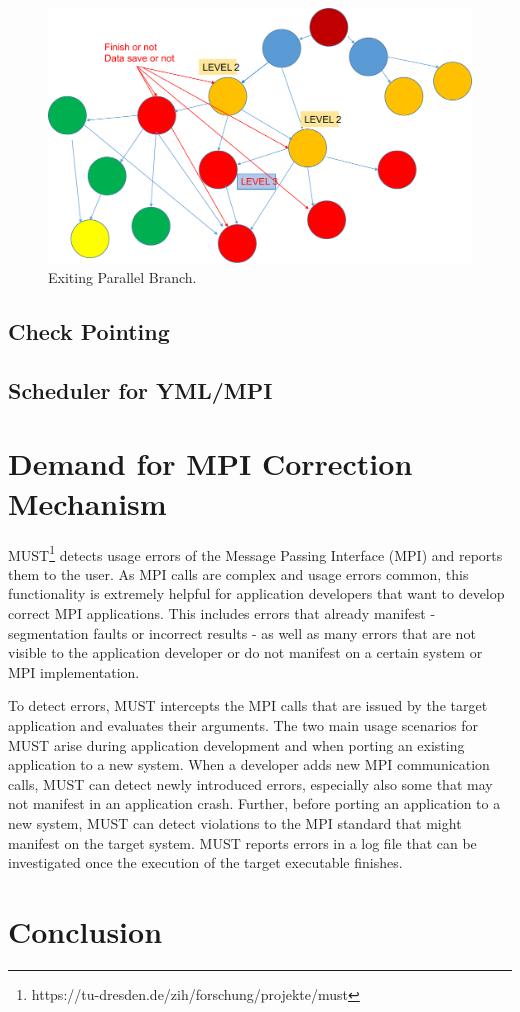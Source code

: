 \begin{figure}[htbp]
	\centering
	\includegraphics[width=5.in]{fig/exit-branch.pdf}
	\caption{Exiting Parallel Branch.}
	\label{fig:exit}
\end{figure}

\subsection{Check Pointing}

\subsection{Scheduler for YML/MPI}
\section{Demand for MPI Correction Mechanism}

MUST\footnote{https://tu-dresden.de/zih/forschung/projekte/must} detects usage errors of the Message Passing Interface (MPI) and reports them to the user. As MPI calls are complex and usage errors common, this functionality is extremely helpful for application developers that want to develop correct MPI applications. This includes errors that already manifest - segmentation faults or incorrect results - as well as many errors that are not visible to the application developer or do not manifest on a certain system or MPI implementation.

To detect errors, MUST intercepts the MPI calls that are issued by the target application and evaluates their arguments. The two main usage scenarios for MUST arise during application development and when porting an existing application to a new system. When a developer adds new MPI communication calls, MUST can detect newly introduced errors, especially also some that may not manifest in an application crash. Further, before porting an application to a new system, MUST can detect violations to the MPI standard that might manifest on the target system. MUST reports errors in a log file that can be investigated once the execution of the target executable finishes.

\section{Conclusion}

\clearemptydoublepage

\clearemptydoublepage